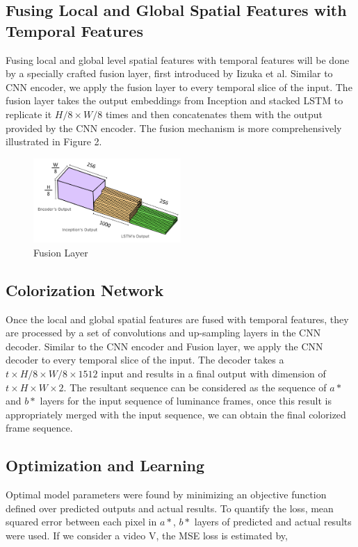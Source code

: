 \documentclass[10pt,twocolumn,letterpaper]{article}
\begin{document}
\subsection{Fusing Local and Global Spatial Features with Temporal Features}
Fusing local and global level spatial features with temporal features will be done by a specially crafted fusion layer, first introduced by Iizuka et al. Similar to CNN encoder, we apply the fusion layer to every temporal slice of the input. The fusion layer takes the output embeddings from Inception and stacked LSTM to replicate it $H/8\times W/8$ times and then concatenates them with the output provided by the CNN encoder. The fusion mechanism is more comprehensively illustrated in Figure 2.

\begin{figure}[!h]
  \centering
  \includegraphics[width=0.5\textwidth]{fusion-layer.png}
  \caption{Fusion Layer}
\end{figure}

\subsection{Colorization Network}
Once the local and global spatial features are fused with temporal features, they are processed by a set of convolutions and up-sampling layers in the CNN decoder. Similar to the CNN encoder and Fusion layer, we apply the CNN decoder to every temporal slice of the input. The decoder takes a $t\times H/8\times W/8\times 1512$ input and results in a final output with dimension of $t\times H\times W\times 2$. The resultant sequence can be considered as the sequence of $a*$ and $b*$ layers for the input sequence of luminance frames, once this result is appropriately merged with the input sequence, we can obtain the final colorized frame sequence.

\subsection{Optimization and Learning}
Optimal model parameters were found by minimizing an objective function defined over predicted outputs and actual results. To quantify the loss, mean squared error between each pixel in $a*$, $b*$ layers of predicted and actual results were used. If we consider a video V, the MSE loss is estimated by,
\end{document}
